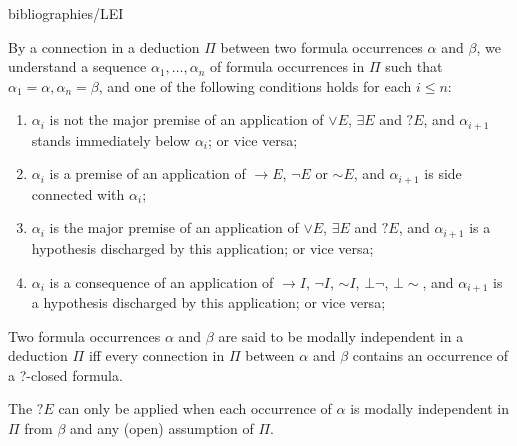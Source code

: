 \begin{entry}{bibliographies/LEI}
\begin{clarifications}
By a connection in a deduction $\Pi$ between two formula occurrences $\alpha$ 
and
$\beta$, we understand a sequence $\alpha_{1},\ldots,\alpha_{n}$ of formula 
occurrences
in $\Pi$ such that $\alpha_{1}=\alpha, \alpha_{n}=\beta$, and one of the 
following
conditions holds for each $i \leq n$:


\begin{enumerate}

\item
 $\alpha_{i}$ is not the major premise of an application of $\vee E$, 
$\exists E$ and
$?E$, and $\alpha_{i+1}$ stands immediately below $\alpha_{i}$; or vice 
versa;

\item 
$\alpha_{i}$ is a premise of an application of $\rightarrow E$, $\neg E$ or $\sim E$, and $\alpha_{i+1}$ is side connected with  $\alpha_{i}$;

\item 
$\alpha_{i}$ is  the major premise of an application of $\vee E$, $\exists E$ and
$?E$, and $\alpha_{i+1}$ is a hypothesis discharged by this application;  or 
vice versa;

\item 
$\alpha_{i}$ is a consequence of an application of $\rightarrow I$, 
$\neg I$, $\sim I$,
$\bot\neg$, $\bot\!\!\sim$, and $\alpha_{i+1}$ is a hypothesis discharged by 
this application;
 or vice versa;
\end{enumerate}

Two formula occurrences $\alpha$
and $\beta$  are said to be modally independent in a deduction $\Pi$ iff every
connection in $\Pi$ between $\alpha$ and $\beta$ contains an occurrence of a 
?-closed formula.

The $?E$ can only be applied when each occurrence of $\alpha$ is modally independent in $\Pi$ from $\beta$ and any (open) assumption of $\Pi$.

\end{clarifications}




\end{entry}
